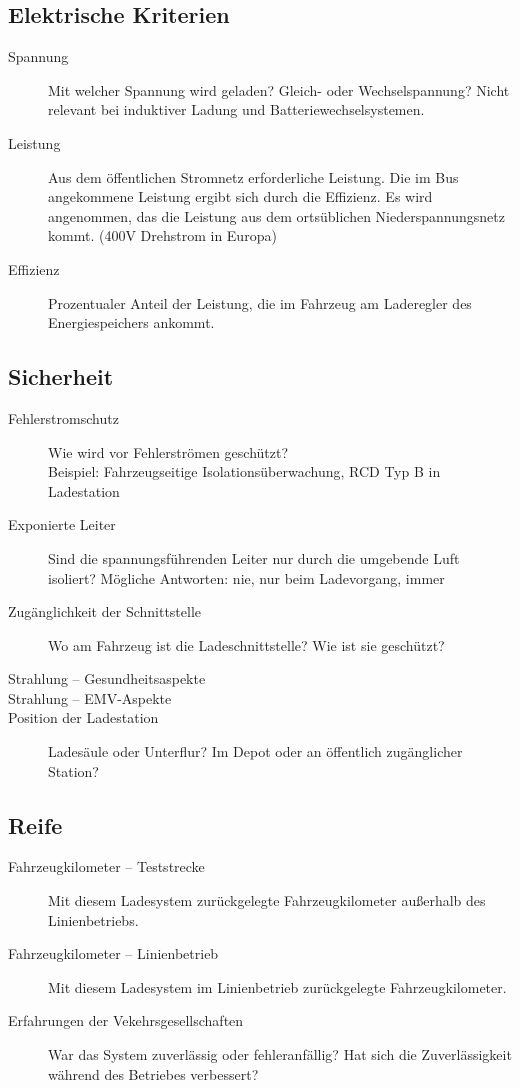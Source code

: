 \documentclass{scrartcl}
\begin{document}
\subsection{Elektrische Kriterien}
\begin{description}
	\item [Spannung]
	Mit welcher Spannung wird geladen? Gleich- oder Wechselspannung? Nicht relevant bei induktiver Ladung und Batteriewechselsystemen.
	\item [Leistung]
	Aus dem öffentlichen Stromnetz erforderliche Leistung. Die im Bus angekommene Leistung ergibt sich durch die Effizienz. Es wird angenommen, das die Leistung aus dem ortsüblichen Niederspannungsnetz kommt. (400V Drehstrom in Europa)
	\item [Effizienz]
		Prozentualer Anteil der Leistung, die im Fahrzeug am Laderegler des Energiespeichers ankommt.		
\end{description}

\subsection{Sicherheit}
\begin{description}
	\item [Fehlerstromschutz]
		Wie wird vor Fehlerströmen geschützt?\\
		Beispiel: Fahrzeugseitige Isolationsüberwachung, RCD Typ B in Ladestation
	\item [Exponierte Leiter]
		Sind die spannungsführenden Leiter nur durch die umgebende Luft isoliert? Mögliche Antworten: nie, nur beim Ladevorgang, immer
	\item [Zugänglichkeit der Schnittstelle]
		Wo am Fahrzeug ist die Ladeschnittstelle? Wie ist sie geschützt?
	\item [Strahlung – Gesundheitsaspekte]
	\item [Strahlung – EMV-Aspekte]
	\item [Position der Ladestation]
		Ladesäule oder Unterflur? Im Depot oder an öffentlich zugänglicher Station?

\end{description}

\subsection{Reife}
\begin{description}
	\item [Fahrzeugkilometer – Teststrecke]
	Mit diesem Ladesystem zurückgelegte Fahrzeugkilometer außerhalb des Linienbetriebs.
	\item [Fahrzeugkilometer – Linienbetrieb]
		Mit diesem Ladesystem im Linienbetrieb zurückgelegte Fahrzeugkilometer.
	\item[Erfahrungen der Vekehrsgesellschaften]
	War das System zuverlässig oder fehleranfällig? Hat sich die Zuverlässigkeit während des Betriebes verbessert?
\end{description}
\end{document}
